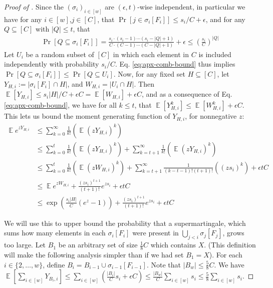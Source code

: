 \documentclass[10pt]{article}
\theoremstyle{definition}\newtheorem{definition}[lemma]{Definition}
\theoremstyle{remark}  \newtheorem*{remark}{Remark}
\DeclareMathOperator{\EE}{\mathbb{E}}
\begin{document}
\begin{proof}[Proof of ]
  Since the $(\sigma_i)_{i\in [w]}$ are $(\epsilon,t)$-wise independent, in particular we have for any $i\in [w]$,$j \in [C]$, that $\Pr\left[j \in \sigma_i[F_i]\right] \le s_i / C + \epsilon$, and for any $Q \subseteq [C]$ with $|Q| \le t$, that 
  \begin{align}
    \Pr[Q \subseteq \sigma_i[F_i]] = \frac{s_i \cdot (s_i-1) \cdots (s_i - |Q| + 1)}{C \cdot (C-1) \cdots (C - |Q|+1)} + \epsilon \le \left(\frac{s_i}{C}\right)^{|Q|}  \label{eq:apx-comb-bound}
  \end{align}
  Let $U_i$ be a random subset of $[C]$ in which each element in $C$ is included independently with probability $s_i / C$. Eq. \ref{eq:apx-comb-bound} thus implies $\Pr[Q \subseteq \sigma_i[F_i]] \le \Pr[Q \subseteq U_i]$. Now, for any fixed set $H \subseteq [C]$, let $Y_{H,i} := |\sigma_i[F_i] \cap H|$, and $W_{H,i} = |U_i \cap H|$.  Then $\EE[Y_{H,i}] \le s_i |H| / C + \epsilon C = \EE[W_{H,i}] + \epsilon C$, and as a consequence of Eq. \ref{eq:apx-comb-bound}, we have for all $k \le t$, that $\EE[Y_{H,i}^k] \le \EE[W_{H,i}^k] + \epsilon C$. This lets us bound the moment generating function of $Y_{H,i}$, for nonnegative $z$:
  \begin{align}
    \EE e^{z Y_{H,i}} &\le \sum_{k = 0}^{\infty} \frac{1}{k!} (\EE (z Y_{H,i})^k) \nonumber\\
      &\le \sum_{k=0}^{t} \frac{1}{k!} (\EE (z Y_{H,i})^k) + \sum_{k=t+1}^{\infty} \frac{1}{k!} (\EE (z Y_{H,i})^k) \nonumber\\
      &\le \sum_{k = 0}^{t} \frac{1}{k!} (\EE (z W_{H,i})^k) + \sum_{k=t+1}^{\infty} \frac{1}{(k-t-1)!(t+1)!} ((z s_i)^{k}) + \epsilon t C \nonumber\\
      &\le \EE e^{z W_{H,i}} + \frac{(z s_i)^{t+1}}{(t+1)!} e^{z s_i}  + \epsilon t C \nonumber\\
      &\le \exp\left({\frac{s_i |H|}{C} (e^z - 1)} \right) +\frac{(z s_i)^{t+1}}{(t+1)!} e^{z s_i} +  \epsilon t C \label{eq:moment-bound}
  \end{align}
  
  We will use this to upper bound the probability that a supermartingale, which sums
  how many elements in each $\sigma_i[F_i]$ were present in $\bigcup_{j < i} \sigma_j[F_j]$, grows too large. Let $B_1$ be an arbitrary set of size $\frac{1}{8} C$ which contains $X$. (This definition will make the following analysis simpler than if we had set $B_1 = X$). For each $i \in \{2,\ldots, w\}$, define $B_i = B_{i-1} \cup \sigma_{i-1}[F_{i-1}]$. Note that $|B_w| \le \frac{5}{8} C$. We have $\EE[\sum_{i \in [w]} Y_{B_i,i}] \le \sum_{i \in [w]}{\left(\frac{|B_i|}{C} s_i + \epsilon C\right)} \le \frac{|B_w|}{C} \sum_{i \in [w]} s_i \le \frac{5}{8} \sum_{i \in [w]} s_i$.
  

\end{proof}
\end{document}
